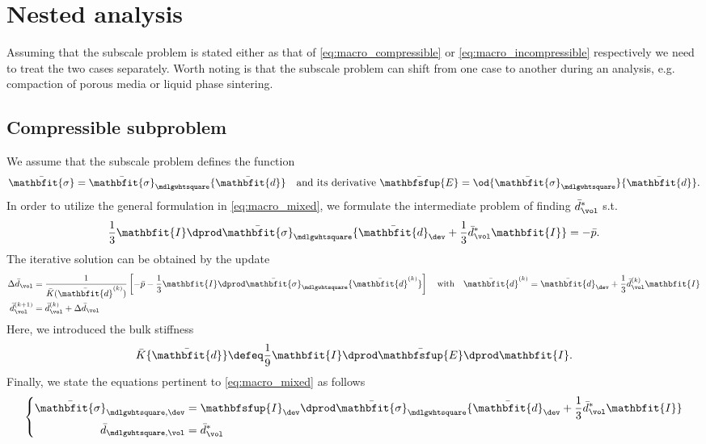 \documentclass[a4paper,11pt]{article}
\renewcommand{\ts}[1]{\mathbfit{#1}}
\renewcommand{\tf}[1]{\mathbfsfup{#1}}
\renewcommand{\Box}{\mdlgwhtsquare}
\begin{document}
\section{Nested analysis}  \label{sec:nested}
Assuming that the subscale problem is stated either as that of \eqref{eq:macro_compressible} or \eqref{eq:macro_incompressible} respectively we need to treat the two cases separately.
Worth noting is that the subscale problem can shift from one case to another during an analysis, e.g. compaction of porous media or liquid phase sintering.

\subsection{Compressible subproblem} \label{sec:nested_compressible}
We assume that the subscale problem defines the function 
\begin{align}
 \bar{\ts\sigma} = \bar{\ts\sigma}_\Box\{\bar{\ts d}\}\quad \text{and its derivative } \bar{\tf E} = \od{\bar{\ts\sigma}_\Box}{\bar{\ts d}}.
\end{align}
In order to utilize the general formulation in \eqref{eq:macro_mixed}, we formulate the intermediate problem of finding $\bar{d}_\vol^*$ s.t.
\begin{align} \label{eq:find_pressure}
 \frac13 \ts I\dprod \bar{\ts\sigma}_\Box\{\bar{\ts d}_\dev + \frac13 \bar{d}_\vol^* \ts I\} = -\bar p.
\end{align}
The iterative solution can be obtained by the update
\begin{align}
 \Delta\bar{d}_\vol &= \frac{1}{\bar K(\bar{\ts d}^{(k)})} \left[-\bar p - \frac13 \ts I\dprod \bar{\ts\sigma}_\Box\{\bar{\ts d}^{(k)}\}\right] \quad \text{with}\quad \bar{\ts d}^{(k)} = \bar{\ts d}_\dev + \frac13 \bar{d}_\vol^{(k)} \ts I\\
 \bar{d}_\vol^{(k+1)} &= \bar{d}_\vol^{(k)} + \Delta\bar{d}_\vol
\end{align}
Here, we introduced the bulk stiffness
\begin{align}
  \bar K\{\bar{\ts d}\} \defeq \frac19  \ts I\dprod \bar{\tf E} \dprod \ts I.
\end{align}
Finally, we state the equations pertinent to \eqref{eq:macro_mixed} as follows
\begin{align}
 \left\{ \begin{aligned}
         \bar{\ts\sigma}_{\Box,\dev} &= \tf I_\dev \dprod \bar{\ts\sigma}_\Box\{\bar{\ts d}_\dev + \frac13 \bar{d}_\vol^* \ts I\}\\
         \bar{d}_{\Box,\vol} &= \bar{d}_\vol^*
        \end{aligned}
 \right.
\end{align}
\end{document}
